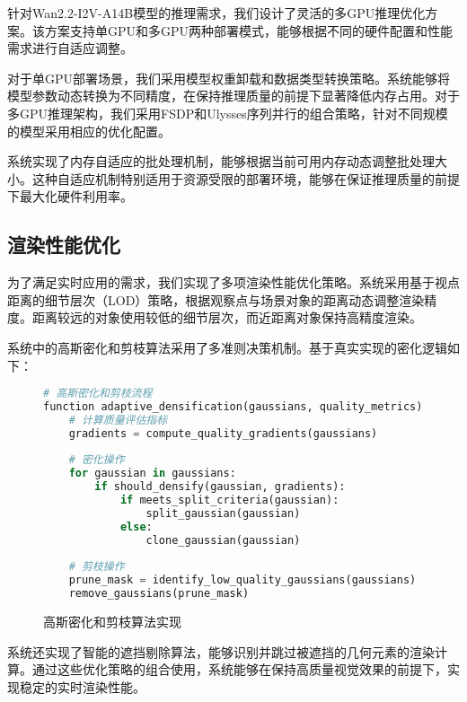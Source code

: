 针对Wan2.2-I2V-A14B模型的推理需求，我们设计了灵活的多GPU推理优化方案。该方案支持单GPU和多GPU两种部署模式，能够根据不同的硬件配置和性能需求进行自适应调整。

对于单GPU部署场景，我们采用模型权重卸载和数据类型转换策略。系统能够将模型参数动态转换为不同精度，在保持推理质量的前提下显著降低内存占用。对于多GPU推理架构，我们采用FSDP和Ulysses序列并行的组合策略，针对不同规模的模型采用相应的优化配置。

系统实现了内存自适应的批处理机制，能够根据当前可用内存动态调整批处理大小。这种自适应机制特别适用于资源受限的部署环境，能够在保证推理质量的前提下最大化硬件利用率。

\subsection{渲染性能优化}

为了满足实时应用的需求，我们实现了多项渲染性能优化策略。系统采用基于视点距离的细节层次（LOD）策略，根据观察点与场景对象的距离动态调整渲染精度。距离较远的对象使用较低的细节层次，而近距离对象保持高精度渲染。

系统中的高斯密化和剪枝算法采用了多准则决策机制。基于真实实现的密化逻辑如下：

\begin{figure}[!b]
  \begin{tmpbox}
    \begin{lstlisting}[language=Python]
# 高斯密化和剪枝流程
function adaptive_densification(gaussians, quality_metrics):
    # 计算质量评估指标
    gradients = compute_quality_gradients(gaussians)
    
    # 密化操作
    for gaussian in gaussians:
        if should_densify(gaussian, gradients):
            if meets_split_criteria(gaussian):
                split_gaussian(gaussian)
            else:
                clone_gaussian(gaussian)
    
    # 剪枝操作
    prune_mask = identify_low_quality_gaussians(gaussians)
    remove_gaussians(prune_mask)
\end{lstlisting}
  \end{tmpbox}
  \caption{高斯密化和剪枝算法实现}
  \label{fig:gaussian-densify}
\end{figure}

系统还实现了智能的遮挡剔除算法，能够识别并跳过被遮挡的几何元素的渲染计算。通过这些优化策略的组合使用，系统能够在保持高质量视觉效果的前提下，实现稳定的实时渲染性能。

